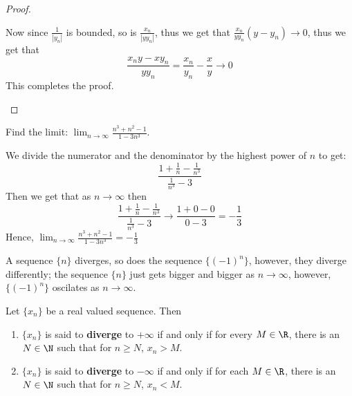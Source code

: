 \begin{proof}
\begin{enumerate}[label=(\arabic*)]
            Now since  $ \frac{1}{|y_n|}$ is bounded, so is $\frac{x_n}{|yy_n|}$, thus we get that $\frac{x_n}{yy_n}(y-y_n) 
            \rightarrow 0$, thus we get that
                \begin{equation*}
                	\frac{x_ny-xy_n}{yy_n}=\frac{x_n}{y_n}-\frac{x}{y} \rightarrow 0
                \end{equation*}
            This completes the proof.
        \end{enumerate}
\end{proof}

\begin{example}
    Find the limit: $\lim_{n \rightarrow \infty} \frac{n^3+n^2-1}{1-3n^3}$.
\end{example} 
\begin{solution}
    We divide the numerator and the denominator by the highest power of $n$ to get:
        \begin{equation}
            \frac{1+\frac{1}{n}-\frac{1}{n^3}}{\frac{1}{n^3}-3}		
        \end{equation}
    Then we get that as $n \rightarrow \infty$ then
        \begin{equation}
            \frac{1+\frac{1}{n}-\frac{1}{n^3}}{\frac{1}{n^3}-3} \rightarrow \frac{1+0-0}{0-3}=-\frac{1}{3}
        \end{equation}
        Hence, $\lim_{n \rightarrow \infty}{\frac{n^3+n^2-1}{1-3n^3}}=-\frac{1}{3}$
\end{solution}

A sequence $\{n\}$ diverges, so does the sequence  $\{(-1)^n\}$, however, they diverge differently; the sequence  $\{n\}$ 
just gets bigger and bigger as  $n \rightarrow \infty$, however, $\{(-1)^n\}$ oscilates as  $n \rightarrow \infty$.

\begin{definition}
    Let $\{x_n\}$ be a real valued sequence. Then
        \begin{enumerate}[label=(\arabic*)]
            \item $\{x_n\}$ is said to \textbf{diverge} to $+\infty$ if and only if for every $M \in \R$, there is an 
                $N \in \N$ such that for $n \geq N$, $x_n>M$.

            \item $\{x_n\}$ is said to \textbf{diverge} to $-\infty$ if and only if for each $M \in \R$, there is an $N \in \N$ such 
                that for $n \geq N$, $x_n<M$.
        \end{enumerate}
\end{definition}

